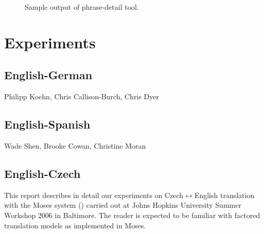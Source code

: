 \documentclass[11pt]{report}
\theoremstyle{plain}
\begin{document}
{\begin{figure}[h]
\centering
\caption{Sample output of phrase-detail tool.}
\label{fig:phrases_used_screenshot}
\end{figure}


\chapter{Experiments}

\section{English-German}
{\sc Philipp Koehn, Chris Callison-Burch, Chris Dyer}
\section{English-Spanish}
{\sc Wade Shen, Brooke Cowan, Christine Moran}

\section{English-Czech}
{  %


\def\clap#1{\hbox to 0pt{\hss #1\hss}}
\def\equo#1{``#1''}
\def\ang#1{{$\langle${#1}$\rangle$}}  %
\def\text#1{{\it{}#1}}


\def\bidir{Czech$\leftrightarrow$English}
\def\tocs{English$\rightarrow$Czech}
\def\toen{Czech$\rightarrow$English}
\def\parcite#1{(\cite{#1})}
\def\perscite#1{\cite{#1}} %

\def\max#1{{\bf{} #1}}
\def\stddev#1{{$\pm$#1}}


\def\subsubsubsection#1{\bigskip{}{\it #1\\}}


This report describes in detail our experiments on \bidir{} translation
with the Moses system \parcite{moses} carried out at Johns Hopkins University
Summer Workshop 2006 in Baltimore. The reader is expected to be
familiar with factored translation models as implemented in Moses.

}}
\end{document}
